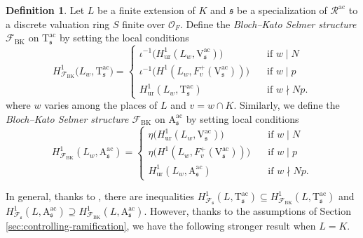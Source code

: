\documentclass[12pt,reqno]{amsart}
\theoremstyle{definition}
\newtheorem{definition}[theorem]{Definition}
\theoremstyle{remark}
\newcommand{\OF}{\mathcal{O}_F}
\newcommand{\V}{\boldsymbol{\mathrm{V}}}
\newcommand{\T}{\boldsymbol{\mathrm{T}}}
\newcommand{\A}{\boldsymbol{\mathrm{A}}}
\newcommand{\ac}{\mathrm{ac}}
\newcommand{\ur}{\mathrm{ur}}
\newcommand{\BK}{\mathrm{BK}}
\newcommand{\sfrak}{\mathfrak{s}}
\begin{document}
\begin{definition}
    Let $L$ be a finite extension of $K$ and $\mathfrak{s}$ be a specialization of $\mathcal{R}^{\ac}$ to a discrete valuation ring $S$ finite over $\OF$. Define the \emph{Bloch--Kato Selmer structure $\mathcal{F}_{\BK}$} on $\T_{\mathfrak{s}}^\ac$ by setting the local conditions
    \begin{equation*}
            H^1_{\mathcal{F}_{\BK}}\big(L_w,\T_{\mathfrak{s}}^\ac\big)=\begin{cases}
                \iota^{-1}\big(H_{\ur}^1(L_w,\V_{\mathfrak{s}}^\ac)\big)\quad &\text{if $w\mid N$}\\
                \iota^{-1}\big(H^1(L_w,F_v^+(\V_{\mathfrak{s}}^\ac))\big)\quad &\text{if $w\mid p$}\\
                H_{\ur}^1(L_w, \T_{\mathfrak{s}}^\ac) &\text{if $w\nmid Np$}.
            \end{cases}
        \end{equation*}
    where $w$ varies among the places of $L$ and $v=w\cap K$. Similarly, we define the \emph{Bloch--Kato Selmer structure $\mathcal{F}_{\BK}$} on $\A_{\mathfrak{s}}^\ac$ by setting local conditions
    \begin{equation*}
            H^1_{\mathcal{F}_{\BK}}(L_w,\A_{\mathfrak{s}}^\ac)=\begin{cases}
                \eta\big(H_{\ur}^1(L_w,\V_{\mathfrak{s}}^\ac)\big)\quad &\text{if $w\mid N$}\\
                \eta\big(H^1(L_w,F_v^+(\V_{\mathfrak{s}}^\ac))\big)\quad &\text{if $w\mid p$}\\
                H_{\ur}^1(L_w, \A_{\mathfrak{s}}^\ac) &\text{if $w\nmid Np$}.
            \end{cases}
        \end{equation*}
\end{definition}

In general, thanks to \cite[Lemma 3.5]{Rubin00:euler-systems}, there are inequalities $H^1_{\mathcal{F}_\sfrak}(L,\T_\sfrak^\ac)\subseteq H^1_{\mathcal{F}_\BK}(L,\T_\sfrak^\ac)$ and $H^1_{\mathcal{F}_\sfrak}(L,\A_\sfrak^\ac)\supseteq H^1_{\mathcal{F}_\BK}(L,\A_\sfrak^\ac)$. However, thanks to the assumptions of Section \ref{sec:controlling-ramification}, we have the following stronger result when $L=K$.
\end{document}
